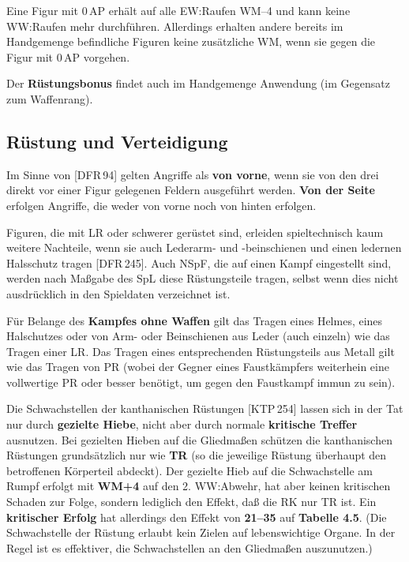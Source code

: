\documentclass[10pt,a4paper,germanpar]{article}
\begin{document}
Eine Figur mit 0\,AP erhält auf alle EW:Raufen WM--4 und kann keine
WW:Raufen mehr durchführen. Allerdings erhalten andere bereits im
Handgemenge befindliche Figuren keine zusätzliche WM, wenn sie gegen
die Figur mit 0\,AP vorgehen.

Der \textbf{Rüstungsbonus} findet auch im Handgemenge Anwendung (im
Gegensatz zum Waffenrang).

\subsection{Rüstung und Verteidigung}

Im Sinne von [DFR\,94] gelten Angriffe als \textbf{von vorne}, wenn
sie von den drei direkt vor einer Figur gelegenen Feldern ausgeführt
werden. \textbf{Von der Seite} erfolgen Angriffe, die weder von vorne
noch von hinten erfolgen.

Figuren, die mit LR oder schwerer gerüstet sind, erleiden
spieltechnisch kaum weitere Nachteile, wenn sie auch Lederarm- und
-beinschienen und einen ledernen Halsschutz tragen [DFR\,245]. Auch
NSpF, die auf einen Kampf eingestellt sind, werden nach Maßgabe des
SpL diese Rüstungsteile tragen, selbst wenn dies nicht ausdrücklich in
den Spieldaten verzeichnet ist.

Für Belange des \textbf{Kampfes ohne Waffen} gilt das Tragen eines
Helmes, eines Halschutzes oder von Arm- oder Beinschienen aus Leder
(auch einzeln) wie das Tragen einer LR. Das Tragen eines
entsprechenden Rüstungsteils aus Metall gilt wie das Tragen von PR
(wobei der Gegner eines Faustkämpfers weiterhein eine vollwertige PR
oder besser benötigt, um gegen den Faustkampf immun zu sein).

Die Schwachstellen der kanthanischen Rüstungen [KTP\,254] lassen
sich in der Tat nur durch \textbf{gezielte Hiebe}, nicht aber durch
normale \textbf{kritische Treffer} ausnutzen. Bei gezielten Hieben auf
die Gliedmaßen schützen die kanthanischen Rüstungen grundsätzlich nur
wie \textbf{TR} (so die jeweilige Rüstung überhaupt den betroffenen
Körperteil abdeckt). Der gezielte Hieb auf die Schwachstelle am Rumpf
erfolgt mit \textbf{WM+4} auf den 2. WW:Abwehr, hat aber keinen
kritischen Schaden zur Folge, sondern lediglich den Effekt, daß die RK
nur TR ist. Ein \textbf{kritischer Erfolg} hat allerdings den Effekt
von \textbf{21--35} auf \textbf{Tabelle 4.5}. (Die Schwachstelle der
Rüstung erlaubt kein Zielen auf lebenswichtige Organe. In der Regel
ist es effektiver, die Schwachstellen an den Gliedmaßen auszunutzen.)
\end{document}
